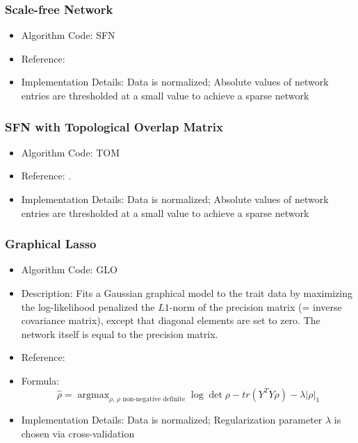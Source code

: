 \documentclass{article}
\newcommand{\argmax}{\operatorname{argmax}}
\begin{document}
\subsubsection{Scale-free Network}

\begin{itemize}
\item Algorithm Code: SFN
\item Reference: \cite{SFN}
\item Implementation Details: Data is normalized; Absolute values of network entries are thresholded at a small value to achieve a sparse network   
\end{itemize}

\subsubsection{SFN with Topological Overlap Matrix}

\begin{itemize}
\item Algorithm Code: TOM
\item Reference: \cite{SFN}.
\item Implementation Details: Data is normalized; Absolute values of network entries are thresholded at a small value to achieve a sparse network   
\end{itemize}

\subsubsection{Graphical Lasso}

\begin{itemize}
\item Algorithm Code: GLO
\item Description: Fits a Gaussian graphical model to the trait data by maximizing the log-likelihood penalized the $L1$-norm of the precision matrix (= inverse covariance matrix), except that diagonal elements are set to zero. The network itself is equal to the precision matrix. 
\item Reference: \cite{GLasso}
\item Formula:
\begin{equation*}
\hat{\rho} = \argmax_{\rho\text{, $\rho$ non-negative definite}} \log \det \rho - tr(Y^TY\rho) - \lambda|\rho|_1
\end{equation*}
\item Implementation Details: Data is normalized; Regularization parameter $\lambda$ is chosen via cross-validation
\end{itemize}
\end{document}
